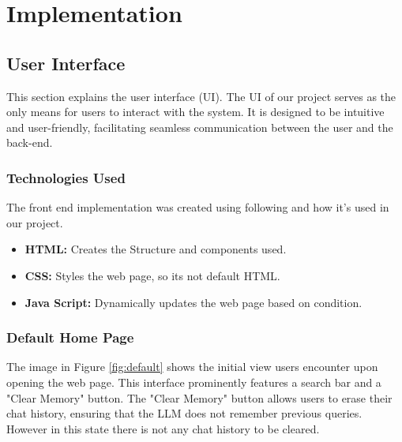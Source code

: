 \documentclass[journal]{IEEEtran}
\theoremstyle{mydefstyle}
\begin{document}


\section{Implementation}
\subsection{User Interface}
This section explains the user interface (UI). The UI of our project serves as the only means for users to interact with the system. It is designed to be intuitive and user-friendly, facilitating seamless communication between the user and the back-end.



\subsubsection{Technologies Used}
The front end implementation was created using following and how it's used in our project.
\begin{itemize}
  \item \textbf{HTML:} Creates the Structure and components used. 
  \item \textbf{CSS:} Styles the web page, so its not default HTML.
  \item \textbf{Java Script:} Dynamically updates the web page based on condition.
\end{itemize}

\subsubsection{Default Home Page}
The image in Figure \ref{fig:default} shows the initial view users encounter upon opening the web page. This interface prominently features a search bar and a "Clear Memory" button. The "Clear Memory" button allows users to erase their chat history, ensuring that the LLM does not remember previous queries. However in this state there is not any chat history to be cleared.
\end{document}

